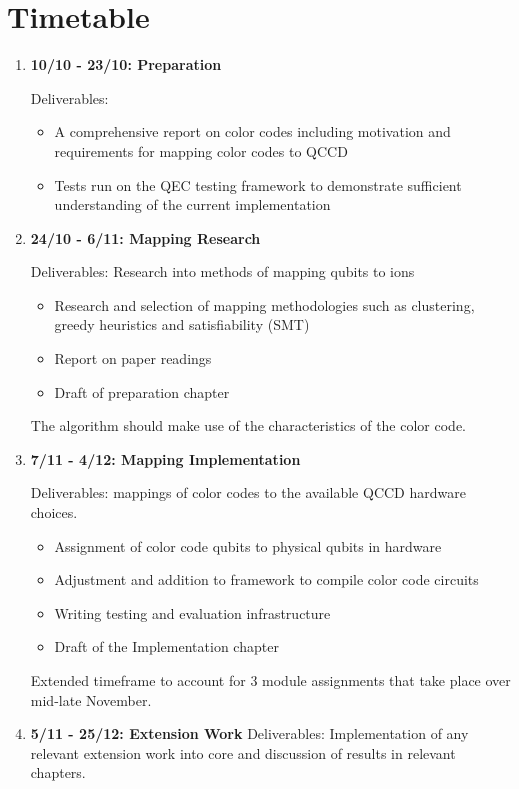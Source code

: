 \section{Timetable}
\begin{enumerate}
    \item \textbf{10/10 - 23/10: Preparation}
    
    Deliverables:
    \begin{itemize}
        \item A comprehensive report on color codes including motivation and requirements for mapping color codes to QCCD
        \item Tests run on the QEC testing framework to demonstrate sufficient understanding of the current implementation
    \end{itemize}

    \item \textbf{24/10 - 6/11: Mapping Research}
    
    Deliverables: Research into methods of mapping qubits to ions
    \begin{itemize}
        \item Research and selection of mapping methodologies such as clustering, greedy heuristics and satisfiability (SMT)
        \item Report on paper readings 
        \item Draft of preparation chapter
    \end{itemize}
    The algorithm should make use of the characteristics of the color code.
    
    \item \textbf{7/11 - 4/12: Mapping Implementation}
    
    Deliverables: mappings of color codes to the available QCCD hardware choices. 
    \begin{itemize}
        \item Assignment of color code qubits to physical qubits in hardware
        \item Adjustment and addition to framework to compile color code circuits
        \item Writing testing and evaluation infrastructure
        \item Draft of the Implementation chapter
    \end{itemize}
    Extended timeframe to account for 3 module assignments that take place over mid-late November.
    
    \item \textbf{5/11 - 25/12: Extension Work}
    Deliverables: Implementation of any relevant extension work into core and discussion of results in relevant chapters.
    

\end{enumerate}
